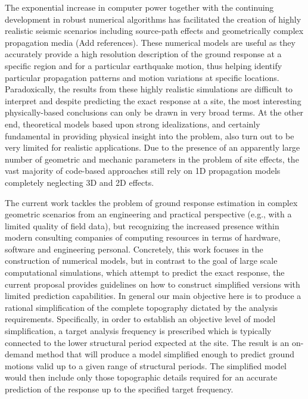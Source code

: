 \documentclass[11pt,letterpaper]{article}
\begin{document}
The exponential increase in computer power together with the continuing development in robust numerical algorithms has facilitated the creation of highly realistic seismic scenarios including source-path effects and geometrically complex propagation media (Add references). These numerical models are useful as they accurately provide a high resolution description of the ground response at a specific region and for a particular earthquake motion, thus helping identify particular propagation patterns and motion variations at specific locations. Paradoxically, the results from these highly realistic simulations are difficult to interpret and despite predicting the exact response at a site, the most interesting physically-based conclusions can only be drawn in very broad terms. At the other end, theoretical models based upon strong idealizations, and certainly fundamental in providing physical insight into the problem, also turn out to be very limited for realistic applications. Due to the presence of an apparently large number of geometric and mechanic parameters in the problem of site effects, the vast majority of code-based approaches still rely on 1D propagation models completely neglecting 3D and 2D effects.

The current work tackles the problem of ground response estimation in complex geometric scenarios from an engineering and practical perspective (e.g., with a limited quality of field data), but recognizing the increased presence within modern consulting companies of computing resources in terms of hardware, software and engineering personal. Concretely, this work focuses in the construction of numerical models, but in contrast to the goal of large scale computational simulations, which attempt to predict the exact response, the current proposal provides guidelines on how to construct simplified versions with limited prediction capabilities. In general our main objective here is to produce a rational simplification of the complete topography dictated by the analysis requirements. Specifically, in order to establish an objective level of model simplification, a target analysis frequency is prescribed which is typically connected to the lower structural period expected at the site. The result is an on-demand method that will produce a model simplified enough to predict ground motions valid up to a given range of structural periods. The simplified model would then include only those topographic details required for an accurate prediction of the response up to the specified target frequency. 
\end{document}
